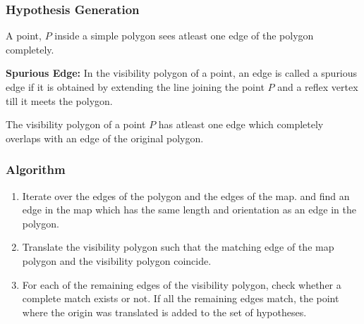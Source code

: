 \documentclass{beamer}
\begin{document}


\frame
{
 \frametitle{Hypothesis Generation}

\begin{theorem}
 A point, $P$ inside a simple polygon sees atleast one edge of the polygon completely.
\end{theorem}

\begin{definition}
 {\bf Spurious Edge:} In the visibility polygon of a point, an edge is called a spurious edge if it is obtained by extending the line
 joining the point $P$ and a reflex vertex till it meets the polygon.
\end{definition}


\begin{theorem}
 The visibility polygon of a point $P$ has atleast one edge which completely overlaps with an edge of the original polygon.
\end{theorem}

}


\frame
{
\frametitle{Algorithm}
\begin{enumerate}
 \item Iterate over the edges of the polygon and the edges of the map. and find an edge in the map which has the same length and
 orientation as an edge in the polygon.

 \item
 Translate the visibility polygon such that the matching edge of the map polygon
and the visibility polygon coincide.

 \item
 For each of the remaining edges of the visibility polygon, check whether a 
complete match exists or not. If all the remaining edges match, the point where the
origin was translated is added to the set of hypotheses.

\end{enumerate}

}
\end{document}
